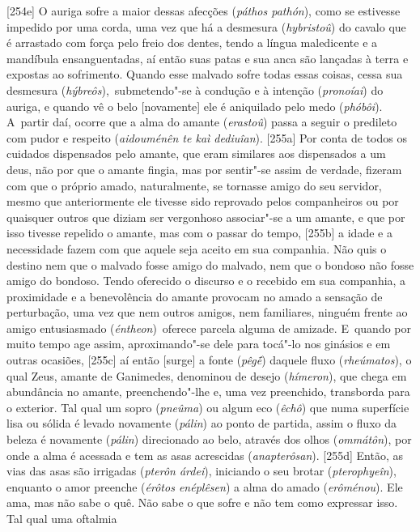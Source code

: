 [254e] O auriga sofre a maior dessas afecções (\emph{páthos
pathón}), como se estivesse impedido por uma corda, uma vez que há a
desmesura (\emph{hybristoû}) do cavalo que é arrastado com força pelo
freio dos dentes, tendo a língua maledicente e a mandíbula
ensanguentadas, aí então suas patas e sua anca são lançadas à terra e
expostas ao sofrimento. Quando esse malvado sofre todas essas coisas,
cessa sua desmesura (\emph{hýbreôs}),~submetendo"-se à condução e à
intenção (\emph{pronoíai}) do auriga, e quando vê o belo [novamente]
ele é aniquilado pelo medo (\emph{phóbôi}). A~partir daí, ocorre que a
alma do amante (\emph{erastoû}) passa a seguir o predileto com pudor e
respeito (\emph{aidouménên te kaì dediuîan}). [255a] Por conta de
todos os cuidados dispensados pelo amante, que eram similares aos
dispensados a um deus, não por que o amante fingia, mas por sentir"-se
assim de verdade, fizeram com que o próprio amado, naturalmente, se
tornasse amigo do seu servidor, mesmo que anteriormente ele tivesse sido
reprovado pelos companheiros ou por quaisquer outros que diziam ser
vergonhoso associar"-se a um amante, e que por isso tivesse repelido o
amante, mas com o passar do tempo, [255b] a idade e a necessidade
fazem com que aquele seja aceito em sua companhia. Não quis o destino
nem que o malvado fosse amigo do malvado, nem que o bondoso não fosse
amigo do bondoso. Tendo oferecido o discurso e o recebido em sua
companhia, a proximidade e a benevolência do amante provocam no amado a
sensação de perturbação, uma vez que nem outros amigos, nem familiares,
ninguém frente ao amigo entusiasmado (\emph{éntheon})~oferece parcela
alguma de amizade. E~quando por muito tempo age assim, aproximando"-se
dele para tocá"-lo nos ginásios e em outras ocasiões, [255c] aí então
[surge] a fonte (\emph{pêgḗ}) daquele fluxo (\emph{rheúmatos}), o
qual Zeus, amante de Ganimedes, denominou de desejo (\emph{hímeron}),
que chega em abundância no amante, preenchendo"-lhe e, uma vez
preenchido, transborda para o exterior. Tal qual um sopro
(\emph{pneûma}) ou algum eco (\emph{êchô}) que numa superfície lisa ou
sólida é levado novamente (\emph{pálin}) ao ponto de partida, assim o
fluxo da beleza é novamente (\emph{pálin}) direcionado ao belo, através
dos olhos (\emph{ommátôn}), por onde a alma é acessada e tem as asas
acrescidas (\emph{anapterôsan}). [255d] Então, as vias das asas são
irrigadas (\emph{pterôn árdei}), iniciando o seu brotar
(\emph{pterophyeîn}), enquanto o amor preenche (\emph{érôtos enéplêsen})
a alma do amado (\emph{erôménou}). Ele ama, mas não sabe o quê. Não sabe
o que sofre e não tem como expressar isso. Tal qual uma oftalmia
